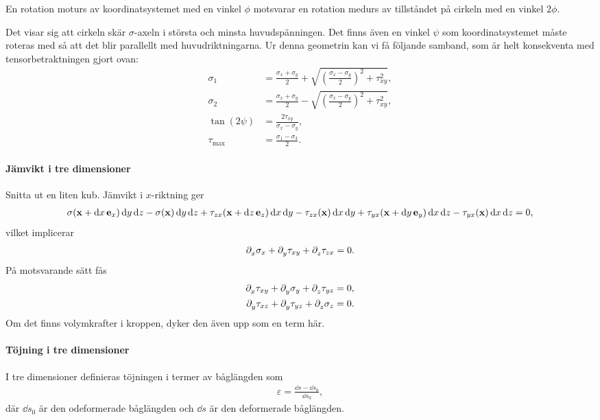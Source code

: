 En rotation moturs av koordinatsystemet med en vinkel $\phi$ motsvarar en rotation medurs av tillståndet på cirkeln med en vinkel $2\phi$.

Det visar sig att cirkeln skär $\sigma$-axeln i största och minsta huvudspänningen. Det finns även en vinkel $\psi$ som koordinatsystemet måste roteras med så att det blir parallellt med huvudriktningarna. Ur denna geometrin kan vi få följande samband, som är helt konsekventa med tensorbetraktningen gjort ovan:
\begin{align*}
	\sigma_{1}        &= \frac{\sigma_{x} + \sigma_{y}}{2} + \sqrt{\left(\frac{\sigma_{x} - \sigma_{y}}{2}\right)^{2} + \tau_{xy}^{2}}, \\
	\sigma_{2}        &= \frac{\sigma_{x} + \sigma_{y}}{2} - \sqrt{\left(\frac{\sigma_{x} - \sigma_{y}}{2}\right)^{2} + \tau_{xy}^{2}}, \\
	\tan(2\psi)       &= \frac{2\tau_{xy}}{\sigma_{x} - \sigma_{y}}, \\
	\tau_{\text{max}} &= \frac{\sigma_{1} - \sigma_{3}}{2}.
\end{align*}

\paragraph{Jämvikt i tre dimensioner}
Snitta ut en liten kub. Jämvikt i $x$-riktning ger
\begin{align*}
	\sigma(\vb{x} + \dd{x}\vb{e}_{x})\dd{y}\dd{z} - \sigma(\vb{x})\dd{y}\dd{z} + \tau_{zx}(\vb{x} + \dd{z}\vb{e}_{z})\dd{x}\dd{y} - \tau_{zx}(\vb{x})\dd{x}\dd{y} + \tau_{yx}(\vb{x} + \dd{y}\vb{e}_{y})\dd{x}\dd{z} - \tau_{yx}(\vb{x})\dd{x}\dd{z} = 0,
\end{align*}
vilket implicerar
\begin{align*}
	\partial_{x}^{}\sigma_{x} + \partial_{y}^{}\tau_{xy} + \partial_{z}^{}\tau_{zx} = 0.
\end{align*}
På motsvarande sätt fås
\begin{align*}
	\partial_{x}^{}\tau_{xy} + \partial_{y}^{}\sigma_{y} + \partial_{z}^{}\tau_{yz} &= 0, \\
	\partial_{y}^{}\tau_{xz} + \partial_{y}^{}\tau_{yz} + \partial_{z}^{}\sigma_{z} &= 0.
\end{align*}
Om det finns volymkrafter i kroppen, dyker den även upp som en term här.

\paragraph{Töjning i tre dimensioner}
I tre dimensioner definieras töjningen i termer av båglängden som
\begin{align*}
	\varepsilon = \frac{\dd{s} - \dd{s_{0}}}{\dd{s_{0}}},
\end{align*}
där $\dd{s_{0}}$ är den odeformerade båglängden och $\dd{s}$ är den deformerade båglängden.

